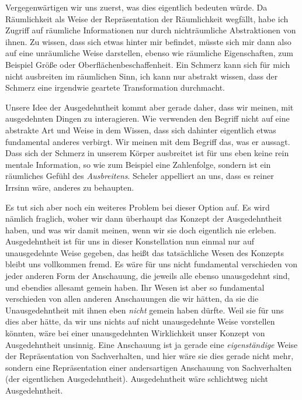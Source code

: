 \documentclass[a4paper, 12pt]{article}
\begin{document}
\begin{onehalfspace}

Vergegenwärtigen wir uns zuerst, was dies eigentlich bedeuten würde. Da Räumlichkeit als Weise der Repräsentation der Räumlichkeit wegfällt, habe ich Zugriff auf räumliche Informationen nur durch nichträumliche Abstraktionen von ihnen. Zu wissen, dass sich etwas hinter mir befindet, müsste sich mir dann also auf eine unräumliche Weise darstellen, ebenso wie räumliche Eigenschaften, zum Beispiel Größe oder Oberflächenbeschaffenheit. Ein Schmerz kann sich für mich nicht ausbreiten im räumlichen Sinn, ich kann nur abstrakt wissen, dass der Schmerz eine irgendwie geartete Transformation durchmacht. 

Unsere Idee der Ausgedehntheit kommt aber gerade daher, dass wir meinen, mit ausgedehnten Dingen zu interagieren. Wie verwenden den Begriff nicht auf eine abstrakte Art und Weise in dem Wissen, dass sich dahinter eigentlich etwas fundamental anderes verbirgt. Wir meinen mit dem Begriff das, was er aussagt. Dass sich der Schmerz in unserem Körper ausbreitet ist für uns eben keine rein mentale Information, so wie zum Beispiel eine Zahlenfolge, sondern ist ein räumliches Gefühl des \emph{Ausbreitens}. Scheler appelliert an uns, dass es reiner Irrsinn wäre, anderes zu behaupten. 

Es tut sich aber noch ein weiteres Problem bei dieser Option auf. Es wird nämlich fraglich, woher wir dann überhaupt das Konzept der Ausgedehntheit haben, und was wir damit meinen, wenn wir sie doch eigentlich nie erleben. Ausgedehntheit ist für uns in dieser Konstellation nun einmal nur auf unausgedehnte Weise gegeben, das heißt das tatsächliche Wesen des Konzepts bleibt uns vollkommen fremd. Es wäre für uns nicht fundamental verschieden von jeder anderen Form der Anschauung, die jeweils alle ebenso unausgedehnt sind, und ebendies allesamt gemein haben. Ihr Wesen ist aber so fundamental verschieden von allen anderen Anschauungen die wir hätten, da sie die Unausgedehntheit mit ihnen eben \emph{nicht} gemein haben dürfte. Weil sie für uns dies aber hätte, da wir uns nichts auf nicht unausgedehnte Weise vorstellen könnten, wäre bei einer unausgedehnten Wirklichkeit unser Konzept von Ausgedehntheit unsinnig. Eine Anschauung ist ja gerade eine \emph{eigenständige} Weise der Repräsentation von Sachverhalten, und hier wäre sie dies gerade nicht mehr, sondern eine Repräsentation einer andersartigen Anschauung von Sachverhalten (der eigentlichen Ausgedehntheit). Ausgedehntheit wäre schlichtweg nicht Ausgedehntheit. 


\end{onehalfspace}
\end{document}
